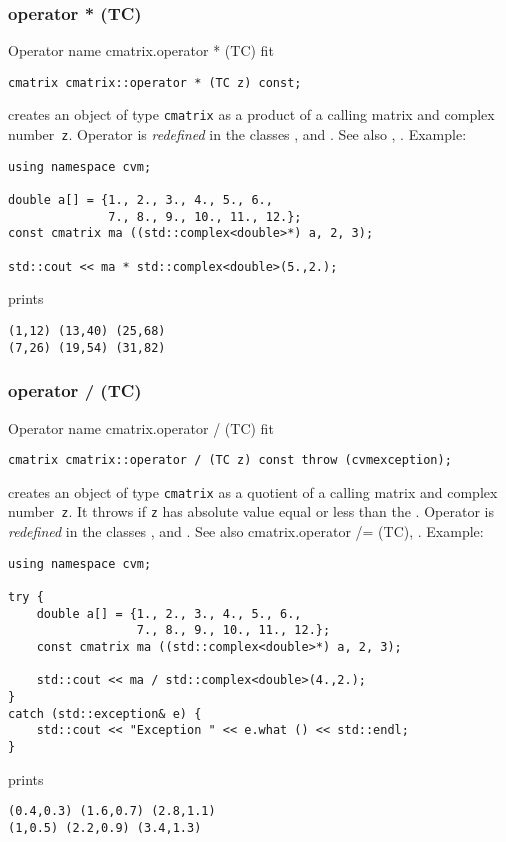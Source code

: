 \subsubsection{operator * (TC)}
Operator%
\pdfdest name {cmatrix.operator * (TC)} fit
\begin{verbatim}
cmatrix cmatrix::operator * (TC z) const;
\end{verbatim}
creates an object of type \verb"cmatrix" as a product of
a calling  matrix and  complex number~\verb"z".
Operator is \emph{redefined} in the classes
,  
and .
See also ,
.
Example:
\begin{Verbatim}
using namespace cvm;

double a[] = {1., 2., 3., 4., 5., 6.,
              7., 8., 9., 10., 11., 12.};
const cmatrix ma ((std::complex<double>*) a, 2, 3);

std::cout << ma * std::complex<double>(5.,2.);
\end{Verbatim}
prints
\begin{Verbatim}
(1,12) (13,40) (25,68)
(7,26) (19,54) (31,82)
\end{Verbatim}
\newpage



\subsubsection{operator / (TC)}
Operator%
\pdfdest name {cmatrix.operator / (TC)} fit
\begin{verbatim}
cmatrix cmatrix::operator / (TC z) const throw (cvmexception);
\end{verbatim}
creates an object of type \verb"cmatrix" as a quotient of
a calling  matrix and  complex number~\verb"z". 
It throws
if \verb"z" has  absolute value equal or less than the
.
Operator is \emph{redefined} in the classes
,  
and .
See also 
{cmatrix.operator /= (TC)},
.
Example:
\begin{Verbatim}
using namespace cvm;

try {
    double a[] = {1., 2., 3., 4., 5., 6.,
                  7., 8., 9., 10., 11., 12.};
    const cmatrix ma ((std::complex<double>*) a, 2, 3);

    std::cout << ma / std::complex<double>(4.,2.);
}
catch (std::exception& e) {
    std::cout << "Exception " << e.what () << std::endl;
}
\end{Verbatim}
prints
\begin{Verbatim}
(0.4,0.3) (1.6,0.7) (2.8,1.1)
(1,0.5) (2.2,0.9) (3.4,1.3)
\end{Verbatim}
\newpage



